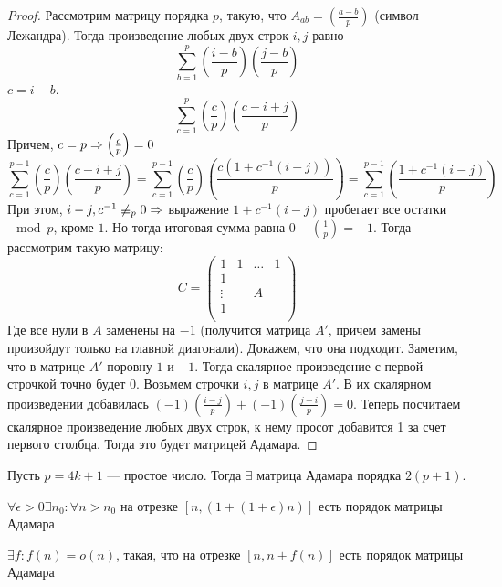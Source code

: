 \begin{proof}
    Рассмотрим матрицу порядка \(p\), такую, что \(A_{ab} = \left(\frac{a - b}{p}\right)\) (символ Лежандра). Тогда произведение любых двух строк \(i, j\) равно 
    \[\sum_{b = 1}^p \left(\frac{i - b}{p}\right)\left(\frac{j - b}{p}\right)\]
    \(c = i - b\).
    \[\sum_{c = 1}^p \left(\frac{c}{p}\right)\left(\frac{c - i + j}{p}\right)\]
    Причем, \(c = p \Rightarrow \left(\frac{c}{p}\right) = 0\)
    \[\sum_{c = 1}^{p - 1} \left(\frac{c}{p}\right)\left(\frac{c - i + j}{p}\right) = \sum_{c = 1}^{p - 1} \left(\frac{c}{p}\right)\left(\frac{c(1 + c^{-1}(i - j))}{p}\right) = \sum_{c = 1}^{p - 1}\left(\frac{1 + c^{-1}(i - j)}{p}\right)\]
    При этом, \(i - j, c^{-1} \not\equiv_p 0 \Rightarrow \) выражение \(1 + c^{-1}(i - j)\) пробегает все остатки \(\mod p\), кроме \(1\). Но тогда итоговая сумма равна \(0 - \left(\frac{1}{p}\right) = -1\). Тогда рассмотрим такую матрицу:
    \[C = \left(\begin{array}{c|ccc}
        1 & 1 & \dots & 1 \\
        \hline
        1 &  &  &  \\
        \vdots &  & A &  \\
        1 &  &  &  \\
    \end{array}\right)\]
    Где все нули в \(A\) заменены на \(-1\) (получится матрица \(A'\), причем замены произойдут только на главной диагонали). Докажем, что она подходит. Заметим, что в матрице \(A'\) поровну \(1\) и \(-1\). Тогда скалярное произведение с первой строчкой точно будет \(0\).
    Возьмем строчки \(i, j\) в матрице \(A'\). В их скалярном произведении добавилась \((-1)\left(\frac{i - j}{p}\right) + (-1)\left(\frac{j - i}{p}\right) = 0\). Теперь посчитаем скалярное произведение любых двух строк, к нему просот добавится 1 за счет первого столбца. Тогда это будет матрицей Адамара.
\end{proof}
\begin{theorem}[Пэли]
    Пусть \(p = 4k + 1\) --- простое число. Тогда \(\exists \) матрица Адамара порядка \(2(p + 1)\).
\end{theorem}
\begin{theorem}[б/д]
    \(\forall \epsilon > 0 \exists n_0: \forall n > n_0\) на отрезке \([n, (1 + (1 + \epsilon)n)]\) есть порядок матрицы Адамара
\end{theorem}
\begin{theorem}
    \(\exists f: f(n) = o(n)\), такая, что на отрезке \([n, n + f(n)]\) есть порядок матрицы Адамара
\end{theorem}

